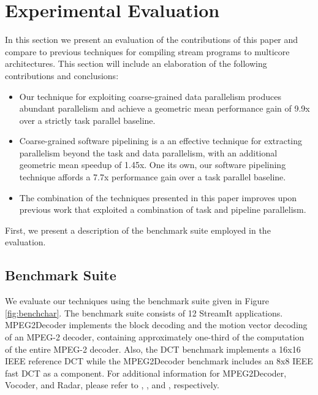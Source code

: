 \section{Experimental Evaluation}

In this section we present an evaluation of the contributions of this
paper and compare to previous techniques for compiling stream programs
to multicore architectures.  This section will include an elaboration
of the following contributions and conclusions:

\begin{itemize}
\item Our technique for exploiting coarse-grained data parallelism
produces abundant parallelism and achieve a geometric mean performance
gain of 9.9x over a strictly task parallel baseline.
\item Coarse-grained software pipelining is a
an effective technique for extracting parallelism beyond the task and
data parallelism, with an additional geometric mean speedup of
1.45x. One its own, our software pipelining technique affords a 7.7x
performance gain over a task parallel baseline.
\item The combination of the techniques presented in this paper
improves upon previous work that exploited a combination of task and
pipeline parallelism.
\end{itemize}

 First, we present a description of the benchmark suite employed
in the evaluation.

\begin{figure*}[t]
\centering
{}
\caption{Benchmark characteristics
\protect\label{fig:benchchar}}
\end{figure*}

\subsection{Benchmark Suite}
We evaluate our techniques using the benchmark suite given in Figure
\ref{fig:benchchar}.   The benchmark suite consists of 12 StreamIt
applications. MPEG2Decoder implements the block decoding and the
motion vector decoding of an MPEG-2 decoder, containing approximately
one-third of the computation of the entire MPEG-2 decoder.  Also, the
DCT benchmark implements a 16x16 IEEE reference DCT while the
MPEG2Decoder benchmark includes an 8x8 IEEE fast DCT as a component.
For additional information for MPEG2Decoder, Vocoder, and Radar,
please refer to \cite{ipdps2006},
\cite{seneff80}, and \cite{pca}, respectively. 


